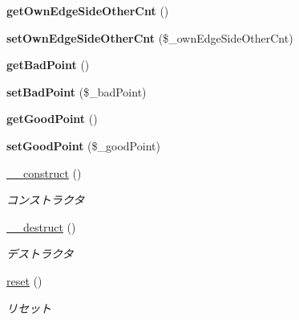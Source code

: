 \begin{DoxyCompactItemize}
\item 
\mbox{\label{class_reversi_anz_a2d0001fd4c483bced75b8e581cc00acf}} 
{\bfseries get\+Own\+Edge\+Side\+Other\+Cnt} ()
\item 
\mbox{\label{class_reversi_anz_ac76d5718ad81e097eb9c273b183a1262}} 
{\bfseries set\+Own\+Edge\+Side\+Other\+Cnt} (\$\+\_\+own\+Edge\+Side\+Other\+Cnt)
\item 
\mbox{\label{class_reversi_anz_ab2a185790727e92d925cb3baf69c3d82}} 
{\bfseries get\+Bad\+Point} ()
\item 
\mbox{\label{class_reversi_anz_a2907c9b2a0659904b5d36900797ec5c0}} 
{\bfseries set\+Bad\+Point} (\$\+\_\+bad\+Point)
\item 
\mbox{\label{class_reversi_anz_a43bc56b57caeb7e1db0066f93e62abd6}} 
{\bfseries get\+Good\+Point} ()
\item 
\mbox{\label{class_reversi_anz_acbbbe1567d8e903078b73049b40aa689}} 
{\bfseries set\+Good\+Point} (\$\+\_\+good\+Point)
\item 
\hyperlink{class_reversi_anz_a095c5d389db211932136b53f25f39685}{\+\_\+\+\_\+construct} ()
\begin{DoxyCompactList}\small\item\em コンストラクタ \end{DoxyCompactList}\item 
\hyperlink{class_reversi_anz_a421831a265621325e1fdd19aace0c758}{\+\_\+\+\_\+destruct} ()
\begin{DoxyCompactList}\small\item\em デストラクタ \end{DoxyCompactList}\item 
\hyperlink{class_reversi_anz_a4a20559544fdf4dcb457e258dc976cf8}{reset} ()
\begin{DoxyCompactList}\small\item\em リセット \end{DoxyCompactList}\end{DoxyCompactItemize}
